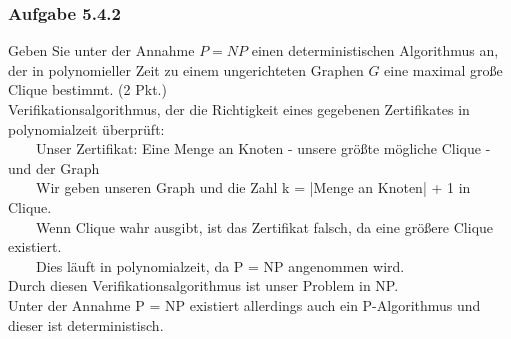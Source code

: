 \documentclass{article}
\begin{document}
\subsubsection*{Aufgabe 5.4.2}
\label{sssec:5.4.2}
Geben Sie unter der Annahme $P = NP$ einen deterministischen Algorithmus an, der in polynomieller
Zeit zu einem ungerichteten Graphen $G$ eine maximal große Clique bestimmt. (2 Pkt.)
\vspace{1cm}\-\\
Verifikationsalgorithmus, der die Richtigkeit eines gegebenen Zertifikates in polynomialzeit überprüft:\\
\-~~~~Unser Zertifikat: Eine Menge an Knoten - unsere größte mögliche Clique - und der Graph\\
\-~~~~Wir geben unseren Graph und die Zahl k = |Menge an Knoten| + 1 in Clique.\\
\-~~~~Wenn Clique wahr ausgibt, ist das Zertifikat falsch, da eine größere Clique existiert.\\
\-~~~~Dies läuft in polynomialzeit, da P = NP angenommen wird.\\
Durch diesen Verifikationsalgorithmus ist unser Problem in NP.\\
Unter der Annahme P = NP existiert allerdings auch ein P-Algorithmus und dieser ist deterministisch.

\newpage
\end{document}
